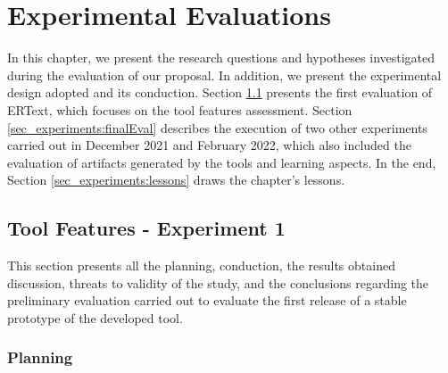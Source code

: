 \chapter{Experimental Evaluations}\label{chap:experiments}

In this chapter, we present the research questions and hypotheses investigated during the evaluation of our proposal. 
In addition, we present the experimental design adopted and its conduction.
Section \ref{sec_experiments:preliminaryEval} presents the first evaluation of ERText, which focuses on the tool features assessment.
Section \ref{sec_experiments:finalEval} describes the execution of two other experiments carried out in December 2021 and February 2022, which also included the evaluation of artifacts generated by the tools and learning aspects.
In the end, Section \ref{sec_experiments:lessons} draws the chapter's lessons.

\section{Tool Features - Experiment 1} 
\label{sec_experiments:preliminaryEval}

This section presents all the planning, conduction, the results obtained discussion, threats to validity of the study, and the conclusions regarding the preliminary evaluation carried out to evaluate the first release of a stable prototype of the developed tool.

\subsection{Planning}
\label{ssec_experiments:preliminary_planning}

